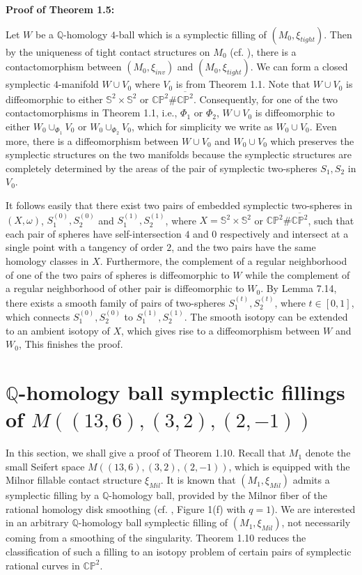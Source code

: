 \documentclass[11pt]{amsart}
\theoremstyle{plain}
\numberwithin{theorem}{section}
\theoremstyle{definition}
\newcommand{\C}{{\mathbb C}}
\newcommand{\Q}{{\mathbb Q}}
\renewcommand{\P}{{\mathbb P}}
\newcommand{\s}{{\mathbb S}}
\begin{document}
{\bf Proof of Theorem 1.5:}

\vspace{2mm}

Let $W$ be a $\Q$-homology $4$-ball which is a symplectic filling of $(M_0,\xi_{tight})$. Then by the uniqueness of tight contact structures on $M_0$ (cf. \cite{GLS}), there is a contactomorphism between $(M_0,\xi_{inv})$ and
 $(M_0,\xi_{tight})$. We can form a closed symplectic $4$-manifold $W\cup V_0$ where $V_0$ is from Theorem 1.1. Note that $W\cup V_0$ is diffeomorphic to either $\s^2\times \s^2$ or $\C\P^2\#\overline{\C\P^2}$.
 Consequently, for one of the two contactomorphisms in Theorem 1.1, i.e., $\Phi_1$ or $\Phi_2$, $W\cup V_0$ is diffeomorphic to either $W_0\cup_{\Phi_1} V_0$ or $W_0\cup_{\Phi_2} V_0$, which for simplicity we write as
 $W_0\cup V_0$. Even more, there is a diffeomorphism between  $W\cup V_0$ 
 and  $W_0\cup V_0$ which preserves the symplectic structures on the two manifolds because the symplectic structures are completely determined by the areas of the pair of symplectic two-spheres $S_1,S_2$ in $V_0$. 
 
It follows easily that there exist two pairs of embedded symplectic two-spheres in $(X,\omega)$, $S_1^{(0)},S_2^{(0)}$ and $S_1^{(1)},S_2^{(1)}$, where $X=\s^2\times \s^2$ or $\C\P^2\#\overline{\C\P^2}$,
 such that each pair of spheres have self-intersection $4$ and $0$ respectively and intersect at a single point 
with a tangency of order $2$, and the two pairs have the same homology classes in $X$. Furthermore,
the complement of a regular neighborhood of one of the two pairs of spheres is diffeomorphic to $W$ while the complement of a regular neighborhood of other pair is diffeomorphic to $W_0$. By Lemma 7.14, there exists a smooth family of pairs of two-spheres $S_1^{(t)},S_2^{(t)}$, where $t\in [0,1]$, which connects 
$S_1^{(0)},S_2^{(0)}$ to $S_1^{(1)},S_2^{(1)}$. The smooth isotopy can be extended to an ambient isotopy of
$X$, which gives rise to a diffeomorphism between $W$ and $W_0$, This finishes the proof. 


\section{$\Q$-homology ball symplectic fillings of $M((13,6), (3,2), (2,-1))$}
In this section, we shall give a proof of Theorem 1.10.  Recall that $M_1$ denote the small Seifert space 
$M((13,6), (3,2), (2,-1))$, which is equipped with the Milnor fillable contact structure $\xi_{Mil}$. It is known that $(M_1,\xi_{Mil})$ admits a symplectic filling by a $\Q$-homology ball, provided by the Milnor fiber of the rational homology disk smoothing (cf. \cite{BS}, Figure 1(f) with $q=1$). We are interested in an arbitrary $\Q$-homology ball symplectic filling of $(M_1,\xi_{Mil})$, not necessarily coming from a smoothing of the singularity. Theorem 1.10
reduces the classification of such a filling to an isotopy problem of certain pairs of symplectic rational curves in
$\C\P^2$.
\end{document}
